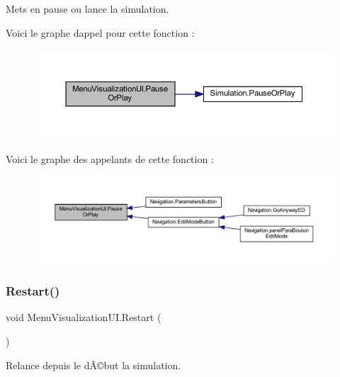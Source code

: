 Mets en pause ou lance la simulation. 

Voici le graphe d\textquotesingle{}appel pour cette fonction \+:
\nopagebreak
\begin{figure}[H]
\begin{center}
\leavevmode
\includegraphics[width=350pt]{class_menu_visualization_u_i_a9affc75173b7b9e70340b2b934398464_cgraph}
\end{center}
\end{figure}
Voici le graphe des appelants de cette fonction \+:
\nopagebreak
\begin{figure}[H]
\begin{center}
\leavevmode
\includegraphics[width=350pt]{class_menu_visualization_u_i_a9affc75173b7b9e70340b2b934398464_icgraph}
\end{center}
\end{figure}
\mbox{\label{class_menu_visualization_u_i_ad71bfeae87aee9f53387e7abf59040c4}} 
\subsubsection{\texorpdfstring{Restart()}{Restart()}}
{\footnotesize\ttfamily void Menu\+Visualization\+U\+I.\+Restart (\begin{DoxyParamCaption}{ }\end{DoxyParamCaption})\hspace{0.3cm}{\ttfamily [inline]}}



Relance depuis le dÃ©but la simulation. 

